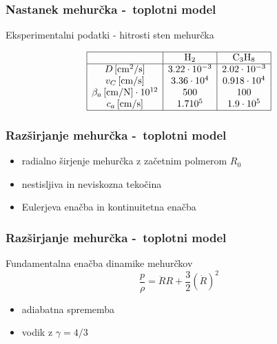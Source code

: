 \documentclass[14pt, t]{beamer}
\begin{document}
\begin{frame}
  \frametitle{Nastanek mehurčka -~toplotni model}
  \begin{block}{Eksperimentalni podatki - hitrosti sten mehurčka}
    \begin{center}
      \[\begin{array}{|c|c|c|}\hline
        & \mathrm{H}_2 & \mathrm{C}_3 \mathrm{H}_8 \\\hline
        D \, [ \mathrm{cm} ^2 / \mathrm{s} ] & 3.22 \cdot 10^{-3} & 2.02 \cdot 10^{-3} \\
        v_C \, [ \mathrm{cm} / \mathrm{s}] & 3.36 \cdot 10^4 & 0.918 \cdot 10^4 \\
        \beta_a \, [ \mathrm{cm} / \mathrm{N}] \cdot 10^{12} & 500 & 100 \\ 
        c_a \, [ \mathrm{cm} / \mathrm{s}] & 1.7 10^5 & 1.9 \cdot 10^{5} \\ \hline
      \end{array}
    \]
  \end{center}
\end{block}
\end{frame}

\begin{frame}
\frametitle{Razširjanje mehurčka -~toplotni model}
\begin{itemize}
  \item <1-> radialno širjenje mehurčka z začetnim polmerom \( R_0 \)
  \item <2-> nestisljiva in neviskozna tekočina
  \item <3-> Eulerjeva enačba in kontinuitetna enačba
\end{itemize}


\end{frame}

\begin{frame}
\frametitle{Razširjanje mehurčka -~toplotni model}
\begin{block}{Fundamentalna enačba dinamike mehurčkov}
  \[ \frac{p}{\rho} = \ddot{R} R + \frac{3}{2} {\left( \dot{R} \right)}^2
  \]

  \begin{itemize}
    \item adiabatna sprememba
    \item vodik z \( \gamma = 4 / 3 \)
  \end{itemize}
\end{block}

\vspace{1cm}

\end{frame}
\end{document}
